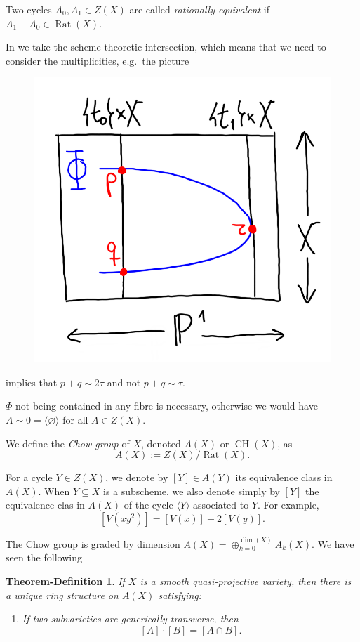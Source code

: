\documentclass[12pt,a4paper]{amsart}
\theoremstyle{plain}
\newtheorem{thmdefn}[thm]{Theorem-Definition}
\theoremstyle{definition}
\theoremstyle{remark}
\begin{document}
Two cycles $A_{0},A_{1}\in Z(X)$ are called \textit{rationally equivalent} if $A_{1}-A_{0}\in \operatorname{Rat}(X)$.

In  we take the scheme theoretic intersection, which means that we need to consider the multiplicities, e.g.~the picture
\begin{figure}[H]
    \centering
    \includegraphics[scale=.75]{pictures/equivalence}
\end{figure}

implies that $p+q\sim 2\tau$ and not $p+q\sim \tau$.

$\Phi$ not being contained in any fibre is necessary, otherwise we would have $A\sim 0=\langle \varnothing \rangle$ for all $A\in Z(X)$.

We define the \textit{Chow group} of $X$, denoted $A(X)$ or $\operatorname{CH}(X)$, as
\[ A(X):=Z(X)/\operatorname{Rat}(X). \]

For a cycle $Y\in Z(X)$, we denote by $[Y]\in A(Y)$ its equivalence class in $A(X)$.
When $Y\subseteq X$ is a subscheme, we also denote simply by $[Y]$ the equivalence clas in $A(X)$ of the cycle $\langle Y\rangle$ associated to $Y$.
For example,
\[ [V(xy^{2})]=[V(x)]+2[V(y)]. \]

The Chow group is graded by dimension $A(X)=\oplus_{k=0}^{\dim(X)}A_{k}(X)$.
We have seen the following

\begin{thmdefn}
    If $X$ is a smooth quasi-projective variety, then there is a unique ring structure on $A(X)$ satisfying:
    \begin{enumerate}[label=$(\star)$]
	\item If two subvarieties are generically transverse, then
	    \begin{equation}\label{eqn:2.2}
		[A]\cdot [B]=[A\cap B].
	    \end{equation}
    \end{enumerate}
\end{thmdefn}
\end{document}
